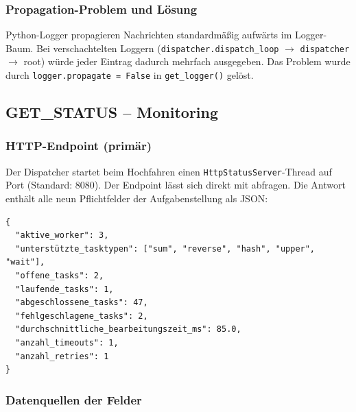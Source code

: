 \subsubsection*{Propagation-Problem und Lösung}

Python-Logger propagieren Nachrichten standardmäßig aufwärts im Logger-Baum.
Bei verschachtelten Loggern (\texttt{dispatcher.dispatch\_loop} $\rightarrow$
\texttt{dispatcher} $\rightarrow$ root) würde jeder Eintrag dadurch mehrfach
ausgegeben. Das Problem wurde durch \texttt{logger.propagate = False}
in \texttt{get\_logger()} gelöst.

\subsection{GET\_STATUS -- Monitoring}
\label{sec:get-status}

\subsubsection*{HTTP-Endpoint (primär)}

Der Dispatcher startet beim Hochfahren einen \texttt{HttpStatusServer}-Thread
auf Port  (Standard: 8080).
Der Endpoint lässt sich direkt mit  abfragen.
Die Antwort enthält alle neun Pflichtfelder der Aufgabenstellung als JSON:

\begin{lstlisting}[language={},caption={GET /status -- Beispielantwort}]
{
  "aktive_worker": 3,
  "unterstützte_tasktypen": ["sum", "reverse", "hash", "upper", "wait"],
  "offene_tasks": 2,
  "laufende_tasks": 1,
  "abgeschlossene_tasks": 47,
  "fehlgeschlagene_tasks": 2,
  "durchschnittliche_bearbeitungszeit_ms": 85.0,
  "anzahl_timeouts": 1,
  "anzahl_retries": 1
}
\end{lstlisting}

\subsubsection*{Datenquellen der Felder}

